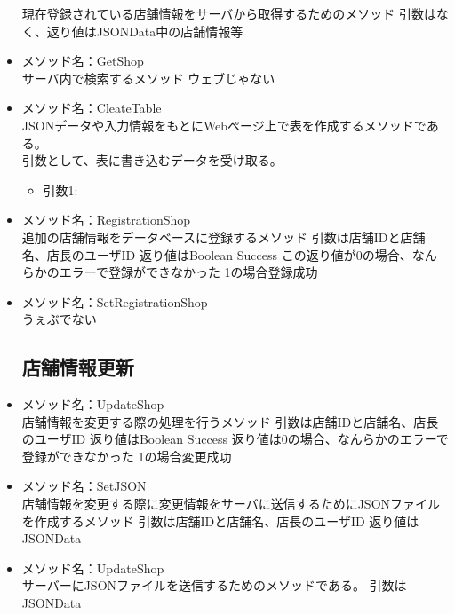\documentclass[a4j]{jarticle}
\begin{document}
\begin{itemize}
現在登録されている店舗情報をサーバから取得するためのメソッド
引数はなく、返り値はJSONData中の店舗情報等

\item メソッド名：GetShop\\

サーバ内で検索するメソッド
ウェブじゃない

\item メソッド名：CleateTable\\
JSONデータや入力情報をもとにWebページ上で表を作成するメソッドである。\\
引数として、表に書き込むデータを受け取る。
	\begin{itemize}
		\item 引数1:
	\end{itemize}
\item メソッド名：RegistrationShop\\

追加の店舗情報をデータベースに登録するメソッド
引数は店舗IDと店舗名、店長のユーザID
返り値はBoolean Success
この返り値が0の場合、なんらかのエラーで登録ができなかった
1の場合登録成功

\item メソッド名：SetRegistrationShop\\

うぇぶでない

\subsection{店舗情報更新}



\item メソッド名：UpdateShop\\

店舗情報を変更する際の処理を行うメソッド
引数は店舗IDと店舗名、店長のユーザID
返り値はBoolean Success
返り値は0の場合、なんらかのエラーで登録ができなかった
1の場合変更成功

\item メソッド名：SetJSON\\

店舗情報を変更する際に変更情報をサーバに送信するためにJSONファイルを作成するメソッド
引数は店舗IDと店舗名、店長のユーザID
返り値はJSONData

\item メソッド名：UpdateShop\\

サーバーにJSONファイルを送信するためのメソッドである。
引数はJSONData


\end{itemize}
\end{document}
